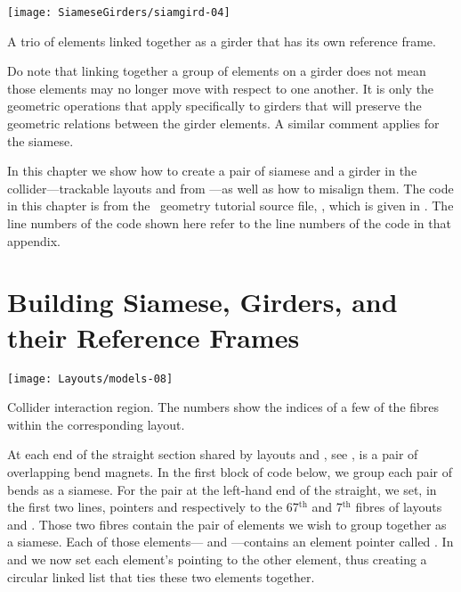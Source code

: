 \begin{MarginFigure}[-21\baselineskip]\forceversofloat
  \texttt{[image: SiameseGirders/siamgird-04]}
  \caption{A trio of elements linked together as a girder that
           has its own reference frame.}
  \label{fig:ll.girder}
\end{MarginFigure}

Do note that linking together a group of elements on a girder does not mean those elements may no longer move with respect to one another. It is only the geometric operations that apply specifically to girders that will preserve the geometric relations between the girder elements. A similar comment applies for the siamese.

%
In this chapter we show how to create a pair of siamese and a girder
in the collider---trackable layouts  and  from
---as well as how to misalign them. The code in
this chapter is from the \PTC\ geometry tutorial source file,
, which is given in .
The line numbers of the code shown here refer to the line numbers
of the code in that appendix.


\section{Building Siamese, Girders, and their Reference Frames}

\begin{MarginFigure}[2\baselineskip]\forceversofloat
  \texttt{[image: Layouts/models-08]}
  \caption{Collider interaction region. The numbers show the indices
           of a few of the fibres within the corresponding layout.}
  \label{fig:col.intxn}
\end{MarginFigure}

%
At each end of the straight section shared by layouts 
and , see , is a pair of overlapping bend
magnets. In the first block of code below, we group each pair of bends
as a siamese. For the pair at the left-hand end of the straight,
we set, in the first two lines, pointers  and 
respectively to the 67$^\text{th}$ and 7$^\text{th}$ fibres of
layouts  and . Those two fibres contain the
pair of elements we wish to group together as a siamese. Each of
those elements--- and ---contains an
element pointer called . In  and
 we now set each element's  pointing
to the other element, thus creating a circular linked list that
ties these two elements together.

